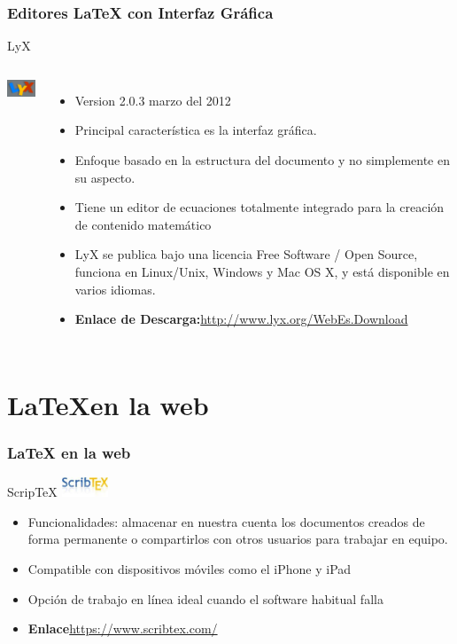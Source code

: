\documentclass[sans serif,9pt,xcolor=dvipsnames]{beamer}%
\begin{document}
\begin{frame}
\frametitle {Editores \LaTeX \hspace{0.1cm}  con Interfaz Gráfica}
\begin{block}{LyX}
\begin{columns}
 \hspace{0.7cm}
\includegraphics[width=1.8cm]{imagenes/lyx.PNG} 
\begin{itemize}
\justifying
\item Version 2.0.3  marzo del 2012
\item Principal característica es la interfaz gráfica.
\item Enfoque basado en la estructura del documento y no simplemente en su aspecto.
\item Tiene un editor de ecuaciones totalmente integrado para la creación de contenido matemático
\item LyX se publica bajo una licencia Free Software / Open Source, funciona en Linux/Unix, Windows y Mac OS X, y está disponible en varios idiomas.
\item \textbf{Enlace de Descarga:}\textcolor{blue}{\url{http://www.lyx.org/WebEs.Download}}
\end{itemize}
\end{columns}
\end{block}

\end{frame}

\section{\LaTeX en la web}
\begin{frame}
\frametitle {\LaTeX \hspace{0.1cm}  en la web}
\begin{block}{ScripTeX}
\hfill \includegraphics[width=1.4cm]{imagenes/scribtex.jpg} 
\begin{itemize}
\justifying
\item Funcionalidades: almacenar en nuestra cuenta los documentos creados de forma permanente o compartirlos con otros usuarios para trabajar en equipo.
\item Compatible con dispositivos móviles como el iPhone y iPad
\item Opción de trabajo en línea ideal cuando el software habitual falla
\item \textbf{Enlace}\textcolor{blue}{\url{https://www.scribtex.com/}}
\end{itemize}
\end{block}
\end{frame}
\end{document}
